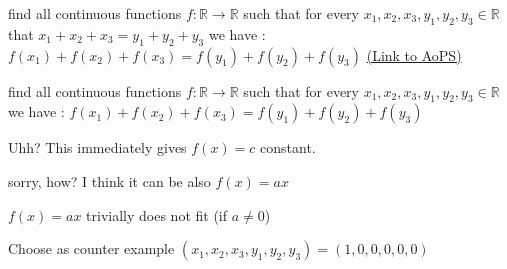 \begin{problem}
	find all continuous functions $f:\mathbb{R}\to\mathbb{R}$ such that for every $x_1,x_2,x_3,y_1,y_2,y_3\in\mathbb{R}$ that $x_1+x_2+x_3=y_1+y_2+y_3$ we have :
$f(x_1)+f(x_2)+f(x_3)=f(y_1)+f(y_2)+f(y_3)$
	\flushright \href{https://artofproblemsolving.com/community/c6h1621220}{(Link to AoPS)}
\end{problem}



\begin{solution}
	\begin{tcolorbox}find all continuous functions $f:\mathbb{R}\to\mathbb{R}$ such that for every $x_1,x_2,x_3,y_1,y_2,y_3\in\mathbb{R}$ we have :
$f(x_1)+f(x_2)+f(x_3)=f(y_1)+f(y_2)+f(y_3)$\end{tcolorbox}

Uhh?
This immediately gives $f(x)=c$ constant.

\end{solution}






\begin{solution}
	\begin{tcolorbox}sorry, how? I think it can be also $f(x)=ax$\end{tcolorbox}
$f(x)=ax$ trivially does not fit (if $a\ne 0$)

Choose as counter example $(x_1,x_2,x_3,y_1,y_2,y_3)=(1,0,0,0,0,0)$



\end{solution}



